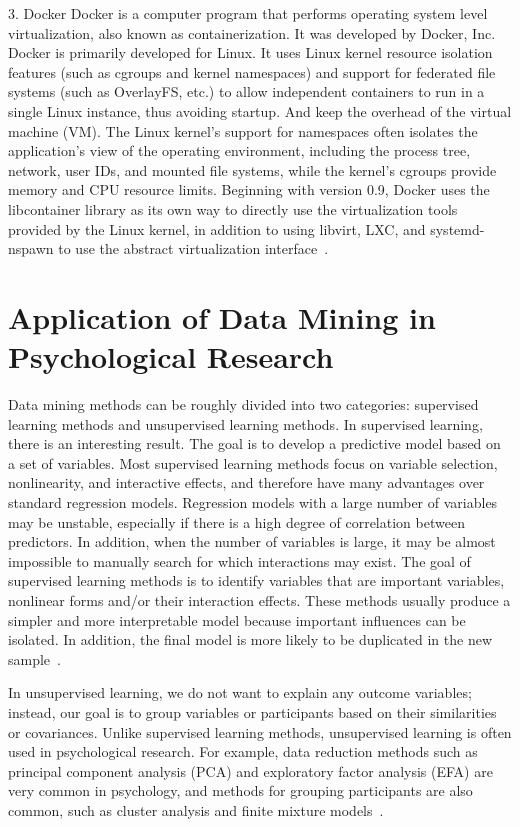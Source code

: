 3. Docker
Docker is a computer program that performs operating system level 
virtualization, also known as containerization. It was developed by
 Docker, Inc. Docker is primarily developed for Linux. It uses 
Linux kernel resource isolation features (such as cgroups and 
kernel namespaces) and support for federated file systems (such as
 OverlayFS, etc.) to allow independent containers to run in a 
single Linux instance, thus avoiding startup. And keep the overhead
 of the virtual machine (VM). The Linux kernel's support for 
namespaces often isolates the application's view of the operating 
environment, including the process tree, network, user IDs, and 
mounted file systems, while the kernel's cgroups provide memory and
 CPU resource limits. Beginning with version 0.9, Docker uses the 
libcontainer library as its own way to directly use the 
virtualization tools provided by the Linux kernel, in addition to 
using libvirt, LXC, and systemd-nspawn to use the abstract 
virtualization interface~\cite{editor10}.

\section{Application of Data Mining in Psychological Research}

Data mining methods can be roughly divided into two categories: 
supervised learning methods and unsupervised learning methods. In 
supervised learning, there is an interesting result. The goal is to
 develop a predictive model based on a set of variables. Most 
supervised learning methods focus on variable selection, 
nonlinearity, and interactive effects, and therefore have many 
advantages over standard regression models. Regression models with
 a large number of variables may be unstable, especially if there 
is a high degree of correlation between predictors. In addition, 
when the number of variables is large, it may be almost impossible
 to manually search for which interactions may exist. The goal of 
supervised learning methods is to identify variables that are 
important variables, nonlinear forms and/or their interaction 
effects. These methods usually produce a simpler and more 
interpretable model because important influences can be isolated. 
In addition, the final model is more likely to be duplicated in the
 new sample~\cite{editor11}.

In unsupervised learning, we do not want to explain any outcome 
variables; instead, our goal is to group variables or participants
 based on their similarities or covariances. Unlike supervised 
learning methods, unsupervised learning is often used in 
psychological research. For example, data reduction methods such as
 principal component analysis (PCA) and exploratory factor analysis
 (EFA) are very common in psychology, and methods for grouping 
participants are also common, such as cluster analysis and finite 
mixture models~\cite{editor11}.

